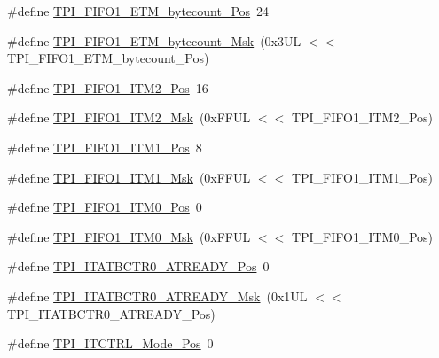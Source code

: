 \begin{DoxyCompactItemize}
\#define \mbox{\hyperlink{group___c_m_s_i_s___t_p_i_gaab31238152b5691af633a7475eaf1f06}{T\+P\+I\+\_\+\+F\+I\+F\+O1\+\_\+\+E\+T\+M\+\_\+bytecount\+\_\+\+Pos}}~24
\item 
\#define \mbox{\hyperlink{group___c_m_s_i_s___t_p_i_gab554305459953b80554fdb1908b73291}{T\+P\+I\+\_\+\+F\+I\+F\+O1\+\_\+\+E\+T\+M\+\_\+bytecount\+\_\+\+Msk}}~(0x3\+U\+L $<$$<$ T\+P\+I\+\_\+\+F\+I\+F\+O1\+\_\+\+E\+T\+M\+\_\+bytecount\+\_\+\+Pos)
\item 
\#define \mbox{\hyperlink{group___c_m_s_i_s___t_p_i_ga1828c228f3940005f48fb8dd88ada35b}{T\+P\+I\+\_\+\+F\+I\+F\+O1\+\_\+\+I\+T\+M2\+\_\+\+Pos}}~16
\item 
\#define \mbox{\hyperlink{group___c_m_s_i_s___t_p_i_gae54512f926ebc00f2e056232aa21d335}{T\+P\+I\+\_\+\+F\+I\+F\+O1\+\_\+\+I\+T\+M2\+\_\+\+Msk}}~(0x\+F\+F\+U\+L $<$$<$ T\+P\+I\+\_\+\+F\+I\+F\+O1\+\_\+\+I\+T\+M2\+\_\+\+Pos)
\item 
\#define \mbox{\hyperlink{group___c_m_s_i_s___t_p_i_gaece86ab513bc3d0e0a9dbd82258af49f}{T\+P\+I\+\_\+\+F\+I\+F\+O1\+\_\+\+I\+T\+M1\+\_\+\+Pos}}~8
\item 
\#define \mbox{\hyperlink{group___c_m_s_i_s___t_p_i_ga3347f42828920dfe56e3130ad319a9e6}{T\+P\+I\+\_\+\+F\+I\+F\+O1\+\_\+\+I\+T\+M1\+\_\+\+Msk}}~(0x\+F\+F\+U\+L $<$$<$ T\+P\+I\+\_\+\+F\+I\+F\+O1\+\_\+\+I\+T\+M1\+\_\+\+Pos)
\item 
\#define \mbox{\hyperlink{group___c_m_s_i_s___t_p_i_ga2188671488417a52abb075bcd4d73440}{T\+P\+I\+\_\+\+F\+I\+F\+O1\+\_\+\+I\+T\+M0\+\_\+\+Pos}}~0
\item 
\#define \mbox{\hyperlink{group___c_m_s_i_s___t_p_i_ga8ae09f544fc1a428797e2a150f14a4c9}{T\+P\+I\+\_\+\+F\+I\+F\+O1\+\_\+\+I\+T\+M0\+\_\+\+Msk}}~(0x\+F\+F\+U\+L $<$$<$ T\+P\+I\+\_\+\+F\+I\+F\+O1\+\_\+\+I\+T\+M0\+\_\+\+Pos)
\item 
\#define \mbox{\hyperlink{group___c_m_s_i_s___t_p_i_gab1eb6866c65f02fa9c83696b49b0f346}{T\+P\+I\+\_\+\+I\+T\+A\+T\+B\+C\+T\+R0\+\_\+\+A\+T\+R\+E\+A\+D\+Y\+\_\+\+Pos}}~0
\item 
\#define \mbox{\hyperlink{group___c_m_s_i_s___t_p_i_gaee320b3c60f9575aa96a8742c4ff9356}{T\+P\+I\+\_\+\+I\+T\+A\+T\+B\+C\+T\+R0\+\_\+\+A\+T\+R\+E\+A\+D\+Y\+\_\+\+Msk}}~(0x1\+U\+L $<$$<$ T\+P\+I\+\_\+\+I\+T\+A\+T\+B\+C\+T\+R0\+\_\+\+A\+T\+R\+E\+A\+D\+Y\+\_\+\+Pos)
\item 
\#define \mbox{\hyperlink{group___c_m_s_i_s___t_p_i_gaa847adb71a1bc811d2e3190528f495f0}{T\+P\+I\+\_\+\+I\+T\+C\+T\+R\+L\+\_\+\+Mode\+\_\+\+Pos}}~0
\item 
$$
\end{DoxyCompactItemize}
